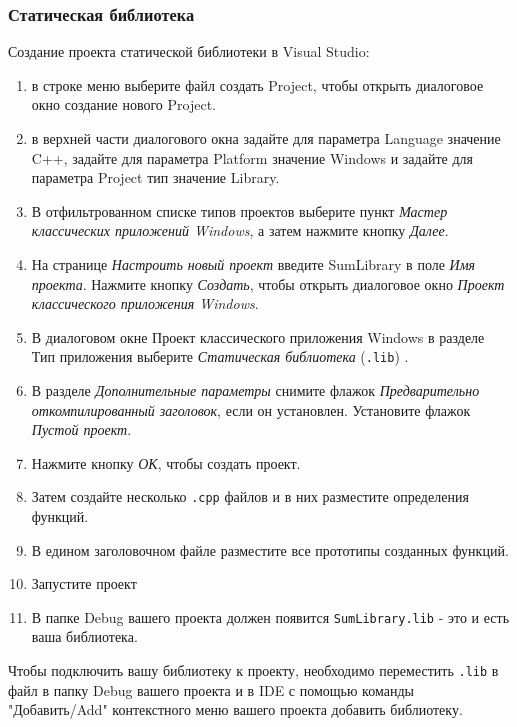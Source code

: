 \subsubsection*{Статическая библиотека}

Создание проекта статической библиотеки в Visual Studio:
\begin{enumerate}
    \item
          в строке меню выберите файл создать Project, чтобы открыть диалоговое окно создание нового Project.
    \item
          в верхней части диалогового окна задайте для параметра Language значение C++, задайте для параметра Platform значение Windows и задайте для параметра Project тип значение Library.
    \item
          В отфильтрованном списке типов проектов выберите пункт \textit{Мастер классических приложений Windows}, а затем нажмите кнопку \textit{Далее}.
    \item
          На странице \textit{Настроить новый проект} введите SumLibrary в поле \textit{Имя проекта}. Нажмите кнопку \textit{Создать}, чтобы открыть диалоговое окно \textit{Проект классического приложения Windows}.
    \item
          В диалоговом окне Проект классического приложения Windows в разделе Тип приложения выберите \textit{Статическая библиотека} (\texttt{.lib}) .
    \item
          В разделе \textit{Дополнительные параметры} снимите флажок \textit{Предварительно откомпилированный заголовок}, если он установлен. Установите флажок \textit{Пустой проект}.
    \item
          Нажмите кнопку \textit{ОК}, чтобы создать проект.
    \item
          Затем создайте несколько \texttt{.cpp} файлов и в них разместите определения функций.
    \item
          В едином заголовочном файле разместите все прототипы созданных функций.
    \item
          Запустите проект
    \item
          В папке Debug вашего проекта должен появится \texttt{SumLibrary.lib} - это и есть ваша библиотека.
\end{enumerate}

Чтобы подключить вашу библиотеку к проекту, необходимо переместить \texttt{.lib} в файл в папку Debug вашего проекта и в IDE с помощью команды "Добавить/Add" контекстного меню вашего проекта добавить библиотеку.

